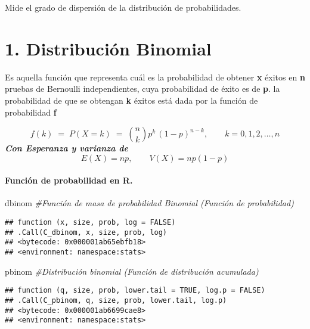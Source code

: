 \documentclass[
]{article}
\newenvironment{Shaded}{\begin{snugshade}}{\end{snugshade}}
\newcommand{\CommentTok}[1]{\textcolor[rgb]{0.56,0.35,0.01}{\textit{#1}}}
\newcommand{\NormalTok}[1]{#1}
\begin{document}
\pagebreak

Mide el grado de dispersión de la distribución de probabilidades.

\hypertarget{distribuciuxf3n-binomial}{%
\section{1. Distribución Binomial}\label{distribuciuxf3n-binomial}}

Es aquella función que representa cuál es la probabilidad de obtener
\textbf{x} éxitos en \textbf{n} pruebas de Bernoulli independientes,
cuya probabilidad de éxito es de \textbf{p}. \pagebreak la probabilidad
de que se obtengan \textbf{k} éxitos está dada por la función de
probabilidad \textbf{f}

\[f(k) \;=\; P(X=k)  \;=\; {n\choose k} p^k\, (1-p)^{n-k}, \qquad k=0,1,2, \ldots, n\]
\textbf{\emph{Con Esperanza y varianza de}}
\[E(X)= np, \qquad V(X)= np(1-p)\]

\hypertarget{funciuxf3n-de-probabilidad-en-r.}{%
\paragraph{Función de probabilidad en
R.}\label{funciuxf3n-de-probabilidad-en-r.}}

\begin{Shaded}
\begin{Highlighting}[]
\NormalTok{dbinom }\CommentTok{\#Función de masa de probabilidad Binomial (Función de probabilidad)}
\end{Highlighting}
\end{Shaded}

\begin{verbatim}
## function (x, size, prob, log = FALSE) 
## .Call(C_dbinom, x, size, prob, log)
## <bytecode: 0x000001ab65ebfb18>
## <environment: namespace:stats>
\end{verbatim}

\begin{Shaded}
\begin{Highlighting}[]
\NormalTok{pbinom }\CommentTok{\#Distribución binomial (Función de distribución acumulada)}
\end{Highlighting}
\end{Shaded}

\begin{verbatim}
## function (q, size, prob, lower.tail = TRUE, log.p = FALSE) 
## .Call(C_pbinom, q, size, prob, lower.tail, log.p)
## <bytecode: 0x000001ab6699cae8>
## <environment: namespace:stats>
\end{verbatim}
\end{document}
